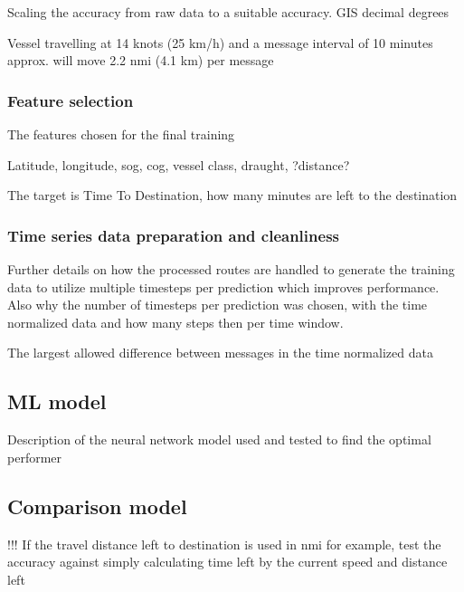 \documentclass[../main.tex]{subfiles}
\begin{document}
Scaling the accuracy from raw data to a suitable accuracy. GIS decimal degrees

Vessel travelling at 14 knots (25 km/h) and a message interval of 10 minutes approx. will move 2.2 nmi (4.1 km) per message


\subsubsection{Feature selection}

The features chosen for the final training 

Latitude, longitude, sog, cog, vessel class, draught, ?distance? 

The target is Time To Destination, how many minutes are left to the destination


\subsubsection{Time series data preparation and cleanliness}

Further details on how the processed routes are handled to generate the training data to utilize multiple timesteps per prediction which improves performance. Also why the number of timesteps per prediction was chosen, with the time normalized data and how many steps then per time window. 

The largest allowed difference between messages in the time normalized data

\subsection{ML model}

Description of the neural network model used and tested to find the optimal performer


\subsection{Comparison model}

!!! If the travel distance left to destination is used in nmi for example, test the accuracy against simply calculating time left by the current speed and distance left 
\end{document}
